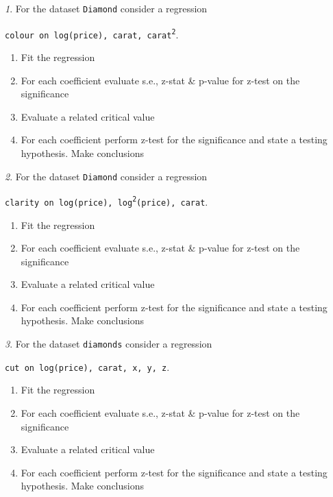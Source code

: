 \documentclass[12pt]{article}
\theoremstyle{remark}
\newtheorem{problem}{}[section]
\begin{document}
\begin{problem}
For the dataset \texttt{Diamond} consider a regression
\begin{center}
	\texttt{colour on log(price), carat, carat\textsuperscript{2}}.
\end{center}
\begin{enumerate}
	\item Fit the regression
	\item For each coefficient evaluate s.e., z-stat \& p-value for z-test on the significance 
	\item Evaluate a related critical value
	\item For each coefficient perform z-test for the significance and state a testing hypothesis. 
	Make conclusions
\end{enumerate}
\end{problem}

\begin{problem}
For the dataset \texttt{Diamond} consider a regression
\begin{center}
	\texttt{clarity on log(price), log\textsuperscript{2}(price), carat}.
\end{center}
\begin{enumerate}
	\item Fit the regression
	\item For each coefficient evaluate s.e., z-stat \& p-value for z-test on the significance 
	\item Evaluate a related critical value
	\item For each coefficient perform z-test for the significance and state a testing hypothesis. 
	Make conclusions
\end{enumerate}
\end{problem}

\begin{problem}
For the dataset \texttt{diamonds} consider a regression
\begin{center}
	\texttt{cut on log(price), carat, x, y, z}.
\end{center}
\begin{enumerate}
	\item Fit the regression
	\item For each coefficient evaluate s.e., z-stat \& p-value for z-test on the significance 
	\item Evaluate a related critical value
	\item For each coefficient perform z-test for the significance and state a testing hypothesis. 
	Make conclusions
\end{enumerate}
\end{problem}
\end{document}
